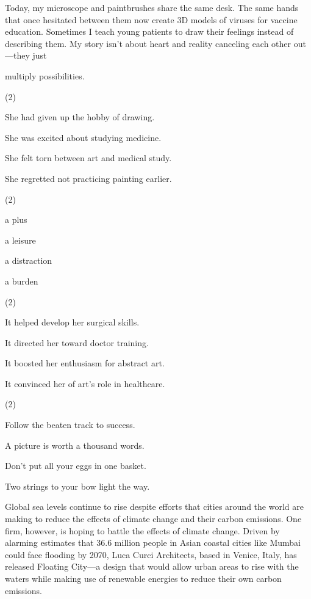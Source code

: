 \documentclass{英语试卷}
\begin{document}
\par Today, my microscope and paintbrushes share the same desk. The same hands that once hesitated between them now create 3D models of viruses for vaccine education. Sometimes I teach young patients to draw their feelings instead of describing them. My story isn't about heart and reality canceling each other out—they just\par
\par multiply possibilities.\par
{}
\begin{choices}(2)
  \item She had given up the hobby of drawing.
  \item She was excited about studying medicine.
  \item She felt torn between art and medical study.
  \item She regretted not practicing painting earlier.
\end{choices}
\begin{choices}(2)
  \item a plus
  \item a leisure
  \item a distraction
  \item a burden
\end{choices}
\begin{choices}(2)
  \item It helped develop her surgical skills.
  \item It directed her toward doctor training.
  \item It boosted her enthusiasm for abstract art.
  \item It convinced her of art's role in healthcare.
\end{choices}
\begin{choices}(2)
  \item Follow the beaten track to success.
  \item A picture is worth a thousand words.
  \item Don't put all your eggs in one basket.
  \item Two strings to your bow light the way.
\end{choices}
\par Global sea levels continue to rise despite efforts that cities around the world are making to reduce the effects of climate change and their carbon emissions. One firm, however, is hoping to battle the effects of climate change. Driven by alarming estimates that 36.6 million people in Asian coastal cities like Mumbai could face flooding by 2070, Luca Curci Architects, based in Venice, Italy, has released Floating City—a design that would allow urban areas to rise with the waters while making use of renewable energies to reduce their own carbon emissions.\par
\end{document}
